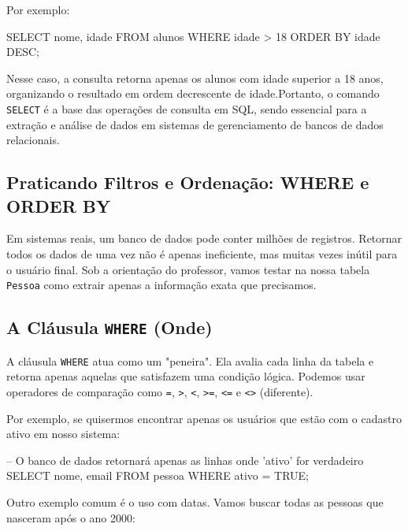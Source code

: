 \documentclass[12pt,a4paper,openright]{book}
\begin{document}
Por exemplo:

\begin{sqlcode}
SELECT nome, idade
FROM alunos
WHERE idade > 18
ORDER BY idade DESC;
\end{sqlcode}

Nesse caso, a consulta retorna apenas os alunos com idade superior a 18 anos, organizando o resultado em ordem decrescente de idade.Portanto, o comando \texttt{SELECT} é a base das operações de consulta em SQL, sendo essencial para a extração e análise de dados em sistemas de gerenciamento de bancos de dados relacionais.

\subsection{Praticando Filtros e Ordenação: WHERE e ORDER BY}

\begin{tcolorbox}[colback=blue!5,colframe=blue!40!black,title=Exercício Dirigido com o Professor: Refinando a Busca]
Em sistemas reais, um banco de dados pode conter milhões de registros. Retornar todos os dados de uma vez não é apenas ineficiente, mas muitas vezes inútil para o usuário final. Sob a orientação do professor, vamos testar na nossa tabela \texttt{Pessoa} como extrair apenas a informação exata que precisamos.
\end{tcolorbox}

\subsection{A Cláusula \texttt{WHERE} (Onde)}

A cláusula \texttt{WHERE} atua como um "peneira". Ela avalia cada linha da tabela e retorna apenas aquelas que satisfazem uma condição lógica. Podemos usar operadores de comparação como \texttt{=}, \texttt{>}, \texttt{<}, \texttt{>=}, \texttt{<=} e \texttt{<>} (diferente).



Por exemplo, se quisermos encontrar apenas os usuários que estão com o cadastro ativo em nosso sistema:

\begin{sqlcode}
-- O banco de dados retornará apenas as linhas onde 'ativo' for verdadeiro
SELECT nome, email 
FROM pessoa 
WHERE ativo = TRUE;
\end{sqlcode}

Outro exemplo comum é o uso com datas. Vamos buscar todas as pessoas que nasceram após o ano 2000:
\end{document}
